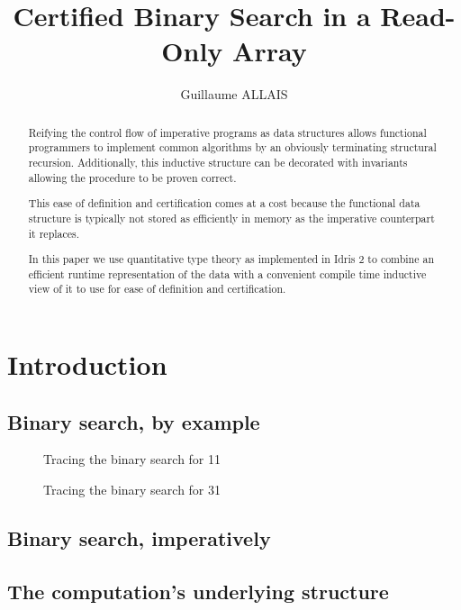\documentclass{article}
\title{Certified Binary Search in a Read-Only Array}
\author{Guillaume ALLAIS}
\begin{document}
\maketitle

\begin{abstract}
  Reifying the control flow of imperative programs as data structures allows
  functional programmers to implement common algorithms by an obviously
  terminating structural recursion. Additionally, this inductive structure
  can be decorated with invariants allowing the procedure to be proven correct.

  This ease of definition and certification comes at a cost because the
  functional data structure is typically not stored as efficiently in
  memory as the imperative counterpart it replaces.

  In this paper we use quantitative type theory as implemented in Idris 2 to
  combine an efficient runtime representation of the data with a convenient
  compile time inductive view of it to use for ease of definition and
  certification.
\end{abstract}

\section{Introduction}

\subsection{Binary search, by example}

\begin{figure}
  \center
  \caption{Tracing the binary search for 11}
\end{figure}

\begin{figure}
  \center
  \caption{Tracing the binary search for 31}
\end{figure}

\subsection{Binary search, imperatively}



\subsection{The computation's underlying structure}
\end{document}
